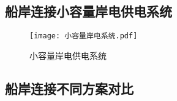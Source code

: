 \subsection{船岸连接小容量岸电供电系统}

\zhlipsum[3]

\begin{figure}[!htp]
	\centering
	\texttt{[image: 小容量岸电系统.pdf]}
	\caption{小容量岸电供电系统}
	\label{fig:小容量岸电供电系统}
\end{figure}



\subsection{船岸连接不同方案对比}




\zhlipsum[4]


\begin{table}[!htp]
	\centering
	\caption[船用岸电供电方式比较]{船用岸电供电方式比较}
	\label{tab:船用岸电供电方式比较}
\end{table}




